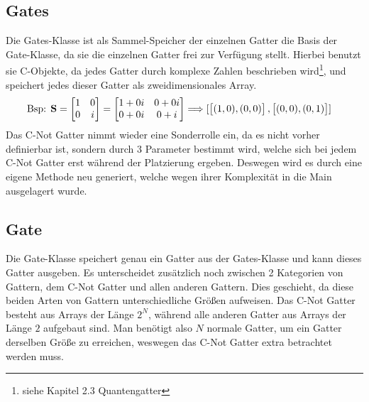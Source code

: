 \documentclass[12pt]{report}
\begin{document}
\subsection{Gates}
Die \glqq Gates\grqq{}-Klasse ist als Sammel-Speicher der einzelnen Gatter die Basis der \glqq Gate\grqq{}-Klasse, da sie die einzelnen Gatter frei zur Verfügung stellt. Hierbei benutzt sie \glqq C\grqq{}-Objekte, da jedes Gatter durch komplexe Zahlen beschrieben wird\footnote{siehe Kapitel 2.3 Quantengatter}, und speichert jedes dieser Gatter als zweidimensionales Array.
\begin{align}
	\text{Bsp: }\textbf{S} = \begin{bmatrix} 1 & 0 \\ 0 & i \end{bmatrix} = 
	\begin{bmatrix} 1+0i & 0+0i \\ 0+0i & 0+i \end{bmatrix} &\Longrightarrow
	\begin{bmatrix}
		~\vspace{-0.5cm} \\ 
		\begin{bmatrix} (1,0) , (0,0) \end{bmatrix},
		\begin{bmatrix} (0,0) , (0,1) \end{bmatrix}
		\\ ~\vspace{-0.5cm}
	\end{bmatrix}
\end{align}
Das C-Not Gatter nimmt wieder eine Sonderrolle ein, da es nicht vorher definierbar ist, sondern durch 3 Parameter bestimmt wird, welche sich bei jedem C-Not Gatter erst während der Platzierung ergeben. Deswegen wird es durch eine eigene Methode neu generiert, welche wegen ihrer Komplexität in die Main ausgelagert wurde.

\newpage

\subsection{Gate}
Die \glqq Gate\grqq{}-Klasse speichert genau ein Gatter aus der \glqq Gates\grqq{}-Klasse und kann dieses Gatter ausgeben. Es unterscheidet zusätzlich noch zwischen 2 Kategorien von Gattern, dem C-Not Gatter und allen anderen Gattern. Dies geschieht, da diese beiden Arten von Gattern unterschiedliche Größen aufweisen. Das C-Not Gatter besteht aus Arrays der Länge $2^N$, während alle anderen Gatter aus Arrays der Länge $2$ aufgebaut sind. Man benötigt also $N$ normale Gatter, um ein Gatter derselben Größe zu erreichen, weswegen das C-Not Gatter extra betrachtet werden muss.
\end{document}
